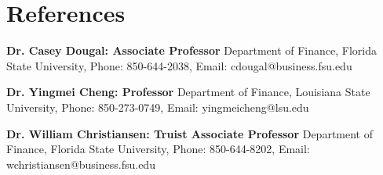 \documentclass[letterpaper,11pt]{article}
\newcommand{\resumeSubHeadingListStart}{\begin{itemize}[leftmargin=0.15in, label={}]}
\newcommand{\resumeSubHeadingListEnd}{\end{itemize}}
\begin{document}
\section{References}
  \vspace{2pt}
  \resumeSubHeadingListStart
    \small{\item{
        \textbf{Dr. Casey Dougal: Associate Professor}{ Department of Finance, Florida State University, Phone: 850-644-2038, Email: cdougal@business.fsu.edu} \\ \vspace{3pt}

        \textbf{Dr. Yingmei Cheng: Professor}{ Department of Finance, Louisiana State University, Phone: 850-273-0749, Email:  yingmeicheng@lsu.edu } \\ \vspace{3pt}

        \textbf{Dr. William Christiansen: Truist Associate Professor}{ Department of Finance, Florida State University, Phone: 850-644-8202, Email:   wchristiansen@business.fsu.edu} \\ \vspace{3pt}

    }}
  \resumeSubHeadingListEnd
\end{document}
